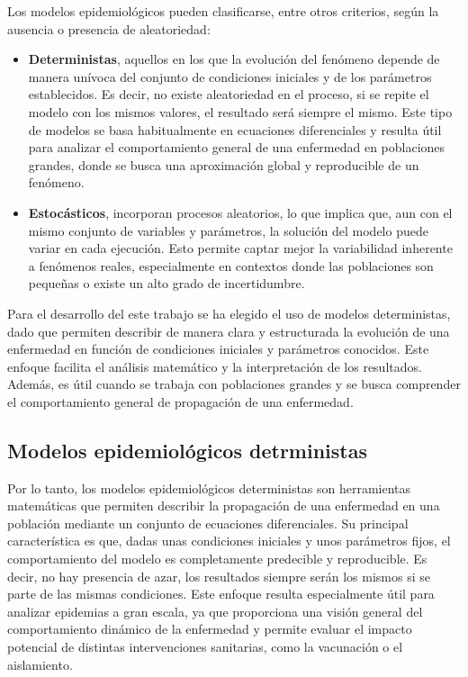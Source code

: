 Los modelos epidemiológicos pueden clasificarse, entre otros criterios, según la ausencia o presencia de aleatoriedad:
\begin{itemize}
    \item \textbf{Deterministas}, aquellos en los que la evolución del fenómeno depende de manera unívoca del conjunto de condiciones iniciales y de los parámetros establecidos. Es decir, no existe aleatoriedad en el proceso, si se repite el modelo con los mismos valores, el resultado será siempre el mismo. Este tipo de modelos se basa habitualmente en ecuaciones diferenciales y resulta útil para analizar el comportamiento general de una enfermedad en poblaciones grandes, donde se busca una aproximación global y reproducible de un fenómeno.
    \item \textbf{Estocásticos}, incorporan procesos aleatorios, lo que implica que, aun con el mismo conjunto de variables y parámetros, la solución del modelo puede variar en cada ejecución. Esto permite captar mejor la variabilidad inherente a fenómenos reales, especialmente en contextos donde las poblaciones son pequeñas o existe un alto grado de incertidumbre.
\end{itemize}
	
Para el desarrollo del este trabajo se ha elegido el uso de modelos deterministas, dado que permiten describir de manera clara y estructurada la evolución de una enfermedad en función de condiciones iniciales y parámetros conocidos. Este enfoque facilita el análisis matemático y la interpretación de los resultados. Además, es útil cuando se trabaja con poblaciones grandes y se busca comprender el comportamiento general de propagación de una enfermedad.

\subsection{Modelos epidemiológicos detrministas}
Por lo tanto, los modelos epidemiológicos deterministas son herramientas matemáticas que permiten describir la propagación de una enfermedad en una población mediante un conjunto de ecuaciones diferenciales. Su principal característica es que, dadas unas condiciones iniciales y unos parámetros fijos, el comportamiento del modelo es completamente predecible y reproducible. Es decir, no hay presencia de azar, los resultados siempre serán los mismos si se parte de las mismas condiciones. Este enfoque resulta especialmente útil para analizar epidemias a gran escala, ya que proporciona una visión general del comportamiento dinámico de la enfermedad y permite evaluar el impacto potencial de distintas intervenciones sanitarias, como la vacunación o el aislamiento.

